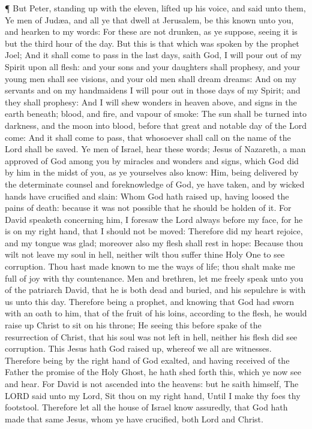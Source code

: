  ¶ But Peter, standing up with the eleven, lifted up his
voice, and said unto them, Ye men of Judæa, and all ye that dwell at
Jerusalem, be this known unto you, and hearken to my words:
 For these are not drunken, as ye suppose, seeing it is but
the third hour of the day.  But this is that which was
spoken by the prophet Joel;  And it shall come to pass in
the last days, saith God, I will pour out of my Spirit upon all flesh:
and your sons and your daughters shall prophesy, and your young men
shall see visions, and your old men shall dream dreams: 
And on my servants and on my handmaidens I will pour out in those days
of my Spirit; and they shall prophesy:  And I will shew
wonders in heaven above, and signs in the earth beneath; blood, and
fire, and vapour of smoke:  The sun shall be turned into
darkness, and the moon into blood, before that great and notable day of
the Lord come:  And it shall come to pass, that whosoever
shall call on the name of the Lord shall be saved.  Ye men
of Israel, hear these words; Jesus of Nazareth, a man approved of God
among you by miracles and wonders and signs, which God did by him in the
midst of you, as ye yourselves also know:  Him, being
delivered by the determinate counsel and foreknowledge of God, ye have
taken, and by wicked hands have crucified and slain:  Whom
God hath raised up, having loosed the pains of death: because it was not
possible that he should be holden of it.  For David
speaketh concerning him, I foresaw the Lord always before my face, for
he is on my right hand, that I should not be moved: 
Therefore did my heart rejoice, and my tongue was glad; moreover also my
flesh shall rest in hope:  Because thou wilt not leave my
soul in hell, neither wilt thou suffer thine Holy One to see corruption.
 Thou hast made known to me the ways of life; thou shalt
make me full of joy with thy countenance.  Men and
brethren, let me freely speak unto you of the patriarch David, that he
is both dead and buried, and his sepulchre is with us unto this day.
 Therefore being a prophet, and knowing that God had sworn
with an oath to him, that of the fruit of his loins, according to the
flesh, he would raise up Christ to sit on his throne;  He
seeing this before spake of the resurrection of Christ, that his soul
was not left in hell, neither his flesh did see corruption.
 This Jesus hath God raised up, whereof we all are
witnesses.  Therefore being by the right hand of God
exalted, and having received of the Father the promise of the Holy
Ghost, he hath shed forth this, which ye now see and hear. 
For David is not ascended into the heavens: but he saith himself, The
LORD said unto my Lord, Sit thou on my right hand,  Until I
make thy foes thy footstool.  Therefore let all the house
of Israel know assuredly, that God hath made that same Jesus, whom ye
have crucified, both Lord and Christ.

